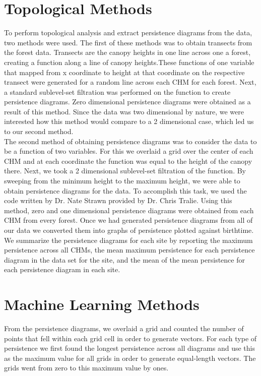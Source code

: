 \documentclass[10pt]{article}
\begin{document}
\section*{Topological Methods}
\indent To perform topological analysis and extract persistence diagrams from the data, two methods were used. The first of these methods was to obtain transects from the forest data. Transects are the canopy heights in one line across one a forest, creating a function along a line of canopy heights.These functions of one variable that mapped from x coordinate to height at that coordinate on the respective transect were generated for a random line across each CHM for each forest. Next, a standard sublevel-set filtration was performed on the function to create persistence diagrams. Zero dimensional persistence diagrams were obtained as a result of this method. Since the data was two dimensional by nature, we were interested how this method would compare to a 2 dimensional case, which led us to our second method.\\

\indent The second method of obtaining persistence diagrams was to consider the data to be a function of two variables. For this we overlaid a grid over the center of each CHM and at each coordinate the function was equal to the height of the canopy there. Next, we took a 2 dimensional sublevel-set filtration of the function. By sweeping from the minimum height to the maximum height, we were able to obtain persistence diagrams for the data. To accomplish this task, we used the code written by Dr. Nate Strawn provided by Dr. Chris Tralie. Using this method, zero and one dimensional persistence diagrams were obtained from each CHM from every forest. Once we had generated persistence diagrams from all of our data we converted them into graphs of persistence plotted against birthtime. We summarize the persistence diagrams for each site by reporting the maximum persistence across all CHMs, the mean maximum persistence for each persistence diagram in the data set for the site, and the mean of the mean persistence for each persistence diagram in each site.


\section*{Machine Learning Methods}

\indent From the persistence diagrams, we overlaid a grid and counted the number of points that fell within each grid cell in order to generate vectors. For each type of persistence we first found the longest persistence across all diagrams and use this as the maximum value for all grids in order to generate equal-length vectors. The grids went from zero to this maximum value by ones.
\end{document}
